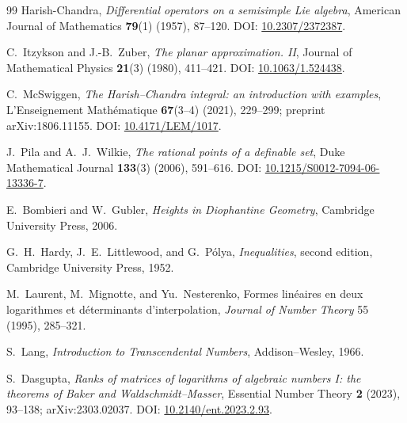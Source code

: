 \documentclass[11pt,oneside]{article}
\theoremstyle{definition}
\theoremstyle{remark}
\begin{document}
\begin{thebibliography}{99}
Harish-Chandra,
\newblock \emph{Differential operators on a semisimple Lie algebra},
\newblock American Journal of Mathematics \textbf{79}(1) (1957), 87--120.
\newblock DOI: \href{https://doi.org/10.2307/2372387}{10.2307/2372387}.

C.~Itzykson and J.-B.~Zuber,
\newblock \emph{The planar approximation. II},
\newblock Journal of Mathematical Physics \textbf{21}(3) (1980), 411--421.
\newblock DOI: \href{https://doi.org/10.1063/1.524438}{10.1063/1.524438}.

C.~McSwiggen,
\newblock \emph{The Harish--Chandra integral: an introduction with examples},
\newblock L'Enseignement Math\'ematique \textbf{67}(3--4) (2021), 229--299;
preprint arXiv:1806.11155.
\newblock DOI: \href{https://doi.org/10.4171/LEM/1017}{10.4171/LEM/1017}.

J.~Pila and A.~J.~Wilkie,
\newblock \emph{The rational points of a definable set},
\newblock Duke Mathematical Journal \textbf{133}(3) (2006), 591--616.
\newblock DOI: \href{https://doi.org/10.1215/S0012-7094-06-13336-7}{10.1215/S0012-7094-06-13336-7}.


E.~Bombieri and W.~Gubler,
\newblock \emph{Heights in Diophantine Geometry},
\newblock Cambridge University Press, 2006.

G.~H.~Hardy, J.~E.~Littlewood, and G.~P\'olya,
\newblock \emph{Inequalities}, second edition,
\newblock Cambridge University Press, 1952.

M.~Laurent, M.~Mignotte, and Yu.~Nesterenko,
\newblock Formes lin\'eaires en deux logarithmes et d\'eterminants
 d'interpolation,
\newblock \emph{Journal of Number Theory} 55 (1995), 285--321.

S.~Lang,
\newblock \emph{Introduction to Transcendental Numbers},
\newblock Addison--Wesley, 1966.



S.~Dasgupta,
\newblock \emph{Ranks of matrices of logarithms of algebraic numbers I: the theorems of Baker
and Waldschmidt--Masser},
\newblock Essential Number Theory \textbf{2} (2023), 93--138; arXiv:2303.02037.
\newblock DOI: \href{https://doi.org/10.2140/ent.2023.2.93}{10.2140/ent.2023.2.93}.


\end{thebibliography}
\end{document}
